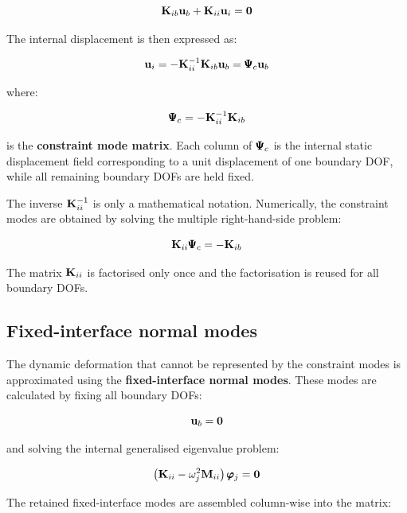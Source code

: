 \begin{equation}
    \mathbf{K}_{ib} \mathbf{u}_b + \mathbf{K}_{ii} \mathbf{u}_i = \mathbf{0}
\end{equation}

The internal displacement is then expressed as:

\begin{equation}
    \mathbf{u}_i = -\mathbf{K}_{ii}^{-1}\mathbf{K}_{ib}\mathbf{u}_b
             = \pmb{\Psi}_c \mathbf{u}_b
\end{equation}

where:

\begin{equation}
    \pmb{\Psi}_c = -\mathbf{K}_{ii}^{-1}\mathbf{K}_{ib}
\end{equation}

is the \textbf{constraint mode matrix}. Each column of $ \pmb{\Psi}_c $ is the
internal static displacement field corresponding to a unit displacement of one
boundary DOF, while all remaining boundary DOFs are held fixed.

The inverse $ \mathbf{K}_{ii}^{-1} $ is only a mathematical notation. Numerically, the
constraint modes are obtained by solving the multiple right-hand-side problem:

\begin{equation}
    \mathbf{K}_{ii}\pmb{\Psi}_c = -\mathbf{K}_{ib}
\end{equation}

The matrix $ \mathbf{K}_{ii} $ is factorised only once and the factorisation is reused
for all boundary DOFs.

\subsection{Fixed-interface normal modes}

The dynamic deformation that cannot be represented by the constraint modes is
approximated using the \textbf{fixed-interface normal modes}. These modes are
calculated by fixing all boundary DOFs:

\begin{equation}
    \mathbf{u}_b = \mathbf{0}
\end{equation}

and solving the internal generalised eigenvalue problem:

\begin{equation}
    \left( \mathbf{K}_{ii} - \omega_j^2 \mathbf{M}_{ii} \right)
    \pmb{\varphi}_j = \mathbf{0}
\end{equation}

The retained fixed-interface modes are assembled column-wise into the matrix:

